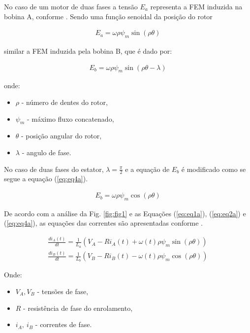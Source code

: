 No caso de um motor de duas fases a tensão $E_a$ representa a FEM induzida na bobina A, conforme \cite{Acarnley}. Sendo uma função senoidal da posição do rotor

\begin{eqnarray}
	\label{eq:eq2a}
	E_a = \omega \rho \psi_m \sin(\rho \theta)
\end{eqnarray}

similar a FEM induzida pela bobina B, que é dado por:

\begin{eqnarray}
		\label{eq:eq3a}
		E_b = \omega \rho \psi_m \sin(\rho \theta - \lambda)
\end{eqnarray}

onde:

\begin{itemize}
	\item $\rho$ - número de dentes do rotor,
	\item $\psi_m$ - máximo fluxo concatenado, 	\item $\theta$ - posição angular do rotor,
	\item $\lambda$ - angulo de fase.
\end{itemize}

No caso de duas fases do estator, $\lambda = \frac{\pi}{2}$ e a equação de $E_b$ é modificado como se segue a equação (\ref{eq:eq4a}).

\begin{eqnarray}
		\label{eq:eq4a}
		E_b = \omega \rho \psi_m \cos(\rho \theta )
\end{eqnarray}

De acordo com a análise da Fig. \ref{fig:fig1} e as Equações (\ref{eq:eq1a}), (\ref{eq:eq2a}) e (\ref{eq:eq4a}), as equações das correntes são apresentadas conforme \cite{kenjo}.

\begin{eqnarray}
	\label{eq:eq5a}
	\frac{d i_A(t)}{dt} = \frac{1}{L_a}\left(V_A - Ri_A(t) + \omega(t) \rho \psi_m \sin(\rho \theta) \right) \\
	\label{eq:eq5b}
	\frac{d i_B(t)}{dt} = \frac{1}{L_b}\left(V_B - Ri_B(t) - \omega(t) \rho \psi_m \cos(\rho \theta) \right) 
\end{eqnarray}

Onde:

\begin{itemize}
	\item $V_A, V_B$ - tensões de fase,
	\item $R$ - resistência de fase do enrolamento,
	\item $i_A,\ i_B$ - correntes de fase.
\end{itemize}

